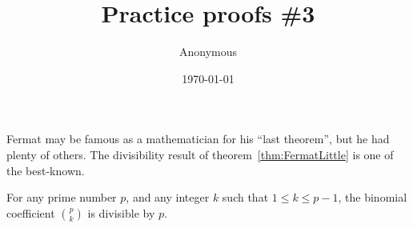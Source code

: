 \documentclass[11pt,reqno,oneside,a4paper]{article}
\title{Practice proofs \#3}
\author{Anonymous}
\date{\today}   %
\begin{document}
\maketitle
\thispagestyle{fancy}




Fermat may be famous as a mathematician for his ``last theorem'', but he had plenty of others. The divisibility result of theorem~\ref{thm:FermatLittle} is one of the best-known.

\begin{lem} \label{lem:FermatLittleMainLemma}
	For any prime number $p$, and any integer $k$ such that $1 \leq k \leq p-1$, the binomial coefficient $\binom{p}{k}$ is divisible by $p$.
\end{lem}
\end{document}
